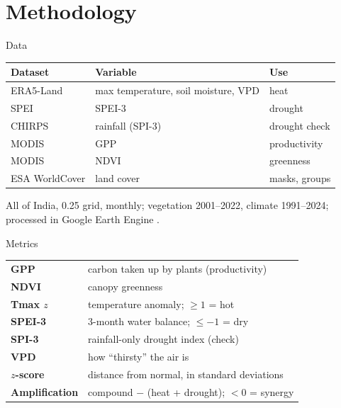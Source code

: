 \documentclass[11pt,aspectratio=169]{beamer}
\begin{document}
\section{Methodology}

\begin{frame}{Data}
  \small
  \begin{tabular}{@{}lll@{}}
    \toprule
    \textbf{Dataset} & \textbf{Variable} & \textbf{Use} \\
    \midrule
    ERA5-Land \citep{munozsabater2021} & max temperature, soil moisture, VPD & heat \\
    SPEI \citep{vicenteserrano2010} & SPEI-3 & drought \\
    CHIRPS \citep{funk2015} & rainfall (SPI-3) & drought check \\
    MODIS \citep{running2015} & GPP & productivity \\
    MODIS \citep{didan2021} & NDVI & greenness \\
    ESA WorldCover \citep{zanaga2022} & land cover & masks, groups \\
    \bottomrule
  \end{tabular}

  \vspace{8pt}
  All of India, 0.25\textdegree{} grid, monthly; vegetation 2001--2022, climate
  1991--2024; processed in Google Earth Engine \citep{gorelick2017}.
\end{frame}

\begin{frame}{Metrics}
  \small
  \renewcommand{\arraystretch}{1.15}
  \begin{tabular}{@{}ll@{}}
    \toprule
    \textbf{GPP} & carbon taken up by plants (productivity) \\
    \textbf{NDVI} & canopy greenness \\
    \textbf{Tmax $z$} & temperature anomaly; $\ge 1$ = hot \\
    \textbf{SPEI-3} & 3-month water balance; $\le -1$ = dry \\
    \textbf{SPI-3} & rainfall-only drought index (check) \\
    \textbf{VPD} & how ``thirsty'' the air is \\
    \textbf{$z$-score} & distance from normal, in standard deviations \\
    \textbf{Amplification} & compound $-$ (heat + drought); $<0$ = synergy \\
    \bottomrule
  \end{tabular}
\end{frame}
\end{document}
